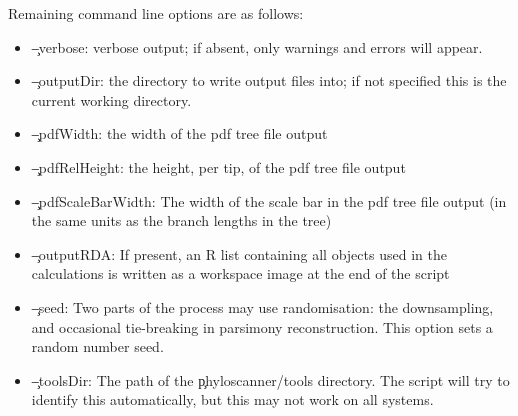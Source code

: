 Remaining command line options are as follows:
\begin{itemize}
\item \c{--verbose}: verbose output; if absent, only warnings and errors will appear.
\item \c{--outputDir}: the directory to write output files into; if not specified this is the current working directory.
\item \c{--pdfWidth}: the width of the pdf tree file output
\item \c{--pdfRelHeight}: the height, per tip, of the pdf tree file output
\item \c{--pdfScaleBarWidth}: The width of the scale bar in the pdf tree file output (in the same units as the branch lengths in the tree)
\item \c{--outputRDA}: If present, an R list containing all objects used in the calculations is written as  a workspace image at the end of the script
\item \c{--seed}: Two parts of the process may use randomisation: the downsampling, and occasional tie-breaking in parsimony reconstruction.
This option sets a random number seed.
\item \c{--toolsDir}: The path of the \c{phyloscanner/tools} directory.
The script will try to identify this automatically, but this may not work on all systems.
\end{itemize}